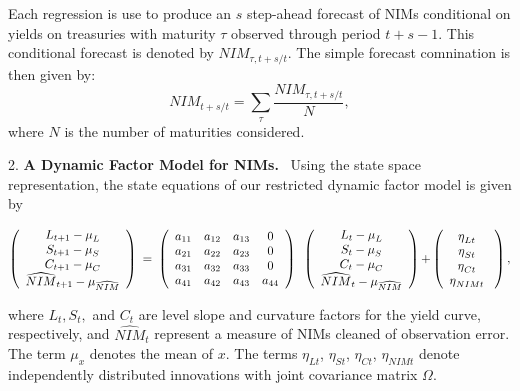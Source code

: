 \documentclass[12pt]{article}
\begin{document}
Each regression is use to produce an $s$ step-ahead forecast of NIMs
conditional on yields on treasuries with maturity $\tau $ observed through
period $t+s-1.$ This conditional forecast is denoted by $NIM_{\tau ,t+s/t}.$%
The simple forecast comnination is then given by:%
\begin{equation*}
NIM_{t+s/t}=\sum_{\tau }\frac{NIM_{\tau ,t+s/t}}{N},
\end{equation*}%
where $N$ is the number of maturities considered.

2. \textbf{A Dynamic Factor Model for NIMs.} \ Using the state space
representation, the state equations of our restricted dynamic factor model
is given by

\begin{equation*}
\left(
\begin{array}{c}
{L_{t+1}-\mu _{L}} \\
{S_{t+1}-\mu _{S}} \\
{C_{t+1}-\mu _{C}} \\
\widehat{NIM}_{t+1}-\mu _{\widehat{NIM}}%
\end{array}%
\right) {\normalsize \ =\ }\left(
\begin{array}{cccc}
a_{11} & a_{12} & a_{13} & 0 \\
a_{21} & a_{22} & a_{23} & 0 \\
a_{31} & a_{32} & a_{33} & 0 \\
a_{41} & a_{42} & a_{43} & a_{44}%
\end{array}%
\right) {\normalsize \ }\left(
\begin{array}{c}
{L_{t}-\mu _{L}} \\
{S_{t}-\mu _{S}} \\
{C_{t}-\mu _{C}} \\
\widehat{NIM}_{t}-\mu _{\widehat{NIM}}%
\end{array}%
\right) {\normalsize +}\left(
\begin{array}{c}
{\eta _{Lt}} \\
{\eta _{St}} \\
{\eta _{Ct}} \\
{\eta _{NIMt}}%
\end{array}%
{\normalsize \ }\right) ,
\end{equation*}

where $L_{t},S_{t},$ and $C_{t}$ are level slope and curvature factors for
the yield curve, respectively, and $\widehat{NIM}_{t}$ represent a measure
of NIMs cleaned of observation error. The term $\mu _{x}$ denotes the mean
of $x$. The terms ${\eta _{Lt}}$, ${\eta _{St}}$, ${\eta _{Ct}}$, ${\eta
_{NIMt}}$ denote independently distributed innovations with joint covariance
matrix $\Omega $.
\end{document}
